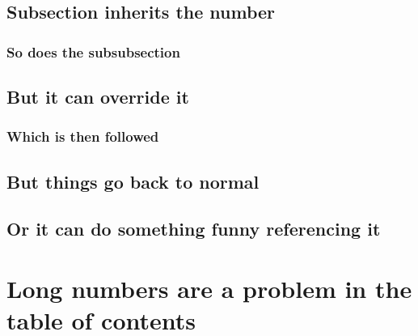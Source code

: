\documentclass{homework}
\begin{document}
\lipsum[9]

\subsection{Subsection inherits the number}

\subsubsection{So does the subsubsection}

\lipsum[10]

\subsection[C$\xi$.b|]{But it can override it}

\subsubsection{Which is then followed}

\lipsum[11]

\subsection{But things go back to normal}

\lipsum[12]

\subsection[\thesection.$\delta$|]{Or it can do something funny referencing it}

\lipsum[13]

\section[2011|]{Long numbers are a problem in the table of contents}
\end{document}
